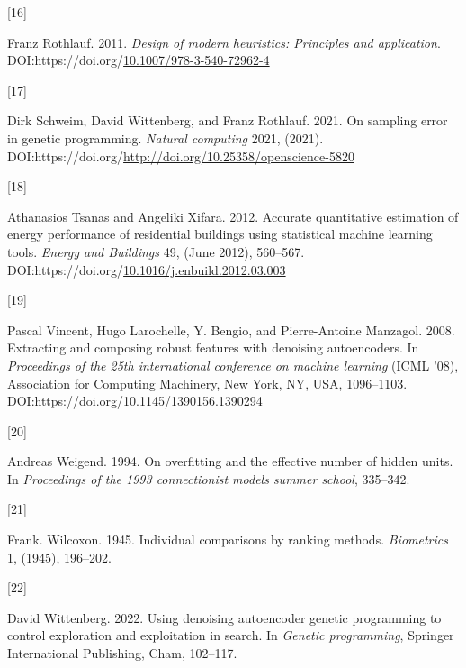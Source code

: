 \documentclass[
  11pt,
]{article}
\newlength{\cslhangindent}
\newlength{\csllabelwidth}
\newlength{\cslentryspacingunit} %
\newenvironment{CSLReferences}[2] %
 {%
  \setlength{\parindent}{0pt}
  \ifodd #1
  \let\oldpar\par
  \def\par{\hangindent=\cslhangindent\oldpar}
  \fi
  \setlength{\parskip}{#2\cslentryspacingunit}
 }%
 {}
\newcommand{\CSLLeftMargin}[1]{\parbox[t]{\csllabelwidth}{#1}}
\newcommand{\CSLRightInline}[1]{\parbox[t]{\linewidth - \csllabelwidth}{#1}\break}
\begin{document}
\begin{CSLReferences}{0}{0}
\leavevmode{}%
\CSLLeftMargin{{[}16{]} }%
\CSLRightInline{Franz Rothlauf. 2011. \emph{Design of modern heuristics: Principles and application}. DOI:https://doi.org/\href{https://doi.org/10.1007/978-3-540-72962-4}{10.1007/978-3-540-72962-4}}

\leavevmode{}%
\CSLLeftMargin{{[}17{]} }%
\CSLRightInline{Dirk Schweim, David Wittenberg, and Franz Rothlauf. 2021. On sampling error in genetic programming. \emph{Natural computing} 2021, (2021). DOI:https://doi.org/\url{http://doi.org/10.25358/openscience-5820}}

\leavevmode{}%
\CSLLeftMargin{{[}18{]} }%
\CSLRightInline{Athanasios Tsanas and Angeliki Xifara. 2012. Accurate quantitative estimation of energy performance of residential buildings using statistical machine learning tools. \emph{Energy and Buildings} 49, (June 2012), 560--567. DOI:https://doi.org/\href{https://doi.org/10.1016/j.enbuild.2012.03.003}{10.1016/j.enbuild.2012.03.003}}

\leavevmode{}%
\CSLLeftMargin{{[}19{]} }%
\CSLRightInline{Pascal Vincent, Hugo Larochelle, Y. Bengio, and Pierre-Antoine Manzagol. 2008. Extracting and composing robust features with denoising autoencoders. In \emph{Proceedings of the 25th international conference on machine learning} (ICML '08), Association for Computing Machinery, New York, NY, USA, 1096--1103. DOI:https://doi.org/\href{https://doi.org/10.1145/1390156.1390294}{10.1145/1390156.1390294}}

\leavevmode{}%
\CSLLeftMargin{{[}20{]} }%
\CSLRightInline{Andreas Weigend. 1994. On overfitting and the effective number of hidden units. In \emph{Proceedings of the 1993 connectionist models summer school}, 335--342.}

\leavevmode{}%
\CSLLeftMargin{{[}21{]} }%
\CSLRightInline{Frank. Wilcoxon. 1945. Individual comparisons by ranking methods. \emph{Biometrics} 1, (1945), 196--202.}

\leavevmode{}%
\CSLLeftMargin{{[}22{]} }%
\CSLRightInline{David Wittenberg. 2022. Using denoising autoencoder genetic programming to control exploration and exploitation in search. In \emph{Genetic programming}, Springer International Publishing, Cham, 102--117.}


\end{CSLReferences}
\end{document}
